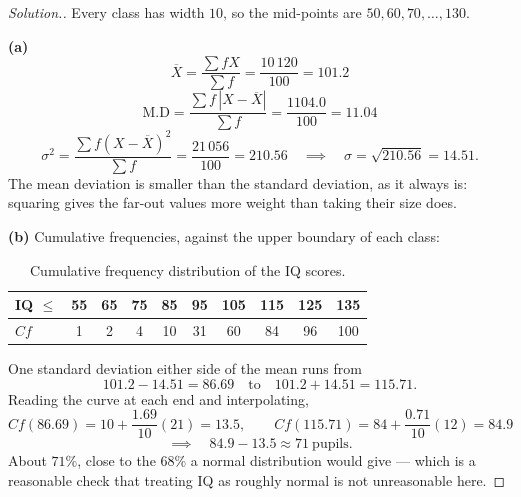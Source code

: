 \documentclass[11pt,a4paper]{article}
\theoremstyle{definition}
\newenvironment{solution}
  {\renewcommand{\qedsymbol}{}\begin{proof}[\textit{Solution}.]}
  {\end{proof}}
\begin{document}
\begin{solution}
Every class has width $10$, so the mid-points are $50, 60, 70, \ldots, 130$.

\textbf{(a)}
\[\overline{X}=\frac{\sum fX}{\sum f}=\frac{10\,120}{100}=101.2\]
\[\text{M.D}=\frac{\sum f\,|X-\overline{X}|}{\sum f}=\frac{1104.0}{100}=11.04\]
\[\sigma^2=\frac{\sum f(X-\overline{X})^2}{\sum f}=\frac{21\,056}{100}=210.56
\quad\implies\quad \sigma=\sqrt{210.56}=14.51.\]
The mean deviation is smaller than the standard deviation, as it always is: squaring gives
the far-out values more weight than taking their size does.

\textbf{(b)} Cumulative frequencies, against the upper boundary of each class:
\begin{table}[H]
\centering
\begin{tabular}{|l|c|c|c|c|c|c|c|c|c|}
\hline
IQ $\leq$ & 55 & 65 & 75 & 85 & 95 & 105 & 115 & 125 & 135\\
\hline
$Cf$ & 1 & 2 & 4 & 10 & 31 & 60 & 84 & 96 & 100\\
\hline
\end{tabular}
\caption{Cumulative frequency distribution of the IQ scores.}
\end{table}
One standard deviation either side of the mean runs from
\[101.2-14.51=86.69\quad\text{to}\quad 101.2+14.51=115.71.\]
Reading the curve at each end and interpolating,
\[Cf(86.69)=10+\frac{1.69}{10}(21)=13.5,\qquad Cf(115.71)=84+\frac{0.71}{10}(12)=84.9\]
\[\implies\quad 84.9-13.5\approx 71\ \text{pupils}.\]
About $71\%$, close to the $68\%$ a normal distribution would give --- which is a reasonable
check that treating IQ as roughly normal is not unreasonable here.
\end{solution}
\end{document}
